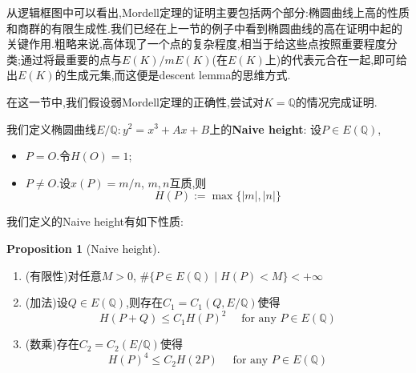 \documentclass[12pt,A4paper,oneside,reqno]{amsart}
\numberwithin{equation}{section}
\theoremstyle{definition}
\newtheorem{proposition}[theorem]{Proposition}
\theoremstyle{plain}
\theoremstyle{plain}
\numberwithin{equation}{section}
\theoremstyle{remark}
\begin{document}
从逻辑框图中可以看出,Mordell定理的证明主要包括两个部分:椭圆曲线上高的性质和商群的有限生成性.我们已经在上一节的例子中看到椭圆曲线的高在证明中起的关键作用.粗略来说,高体现了一个点的复杂程度,相当于给这些点按照重要程度分类;通过将最重要的点与$E(K)/mE(K)$(在$E(K)$上)的代表元合在一起,即可给出$E(K)$的生成元集,而这便是descent lemma的思维方式.

在这一节中,我们假设弱Mordell定理的正确性,尝试对$K=\mathbb{Q}$的情况完成证明.

我们定义椭圆曲线$E/\mathbb{Q}:y^2=x^3+Ax+B$上的\textbf{Naive height}:
设$P \in E(\mathbb{Q})$,
\begin{itemize}
	\item $P=O$.令$H(O)=1$;
	\item $P \neq O$.设$x(P)=m/n$, $m,n$互质,则
	$$H(P):=\max \{|m|,|n|\}$$
\end{itemize}
我们定义的Naive height有如下性质:
\begin{proposition}[Naive height]\label{prop:naiveht}\
	\begin{enumerate}[1.]
		\item (有限性)对任意$M>0$, $\#\{P \in E(\mathbb{Q})\mid H(P)<M \} < + \infty$
		\item (加法)设$Q \in E(\mathbb{Q})$,则存在$C_1=C_1(Q,E/\mathbb{Q})$使得
		$$H(P+Q) \leqslant C_1H(P)^2 \quad\text{ for any }P \in E(\mathbb{Q})$$
		\item (数乘)存在$C_2=C_2(E/\mathbb{Q})$使得
		$$H(P)^4 \leqslant C_2H(2P) \quad\text{ for any }P \in E(\mathbb{Q})$$
	\end{enumerate}
\end{proposition}
\end{document}
